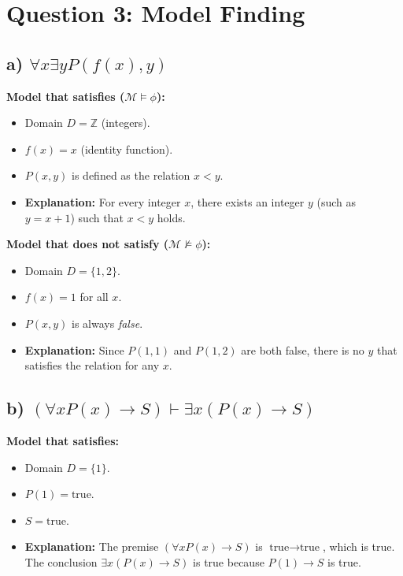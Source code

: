 \documentclass{article}
\begin{document}
\newpage
\section*{Question 3: Model Finding}
\subsection*{a) $\forall x \exists y P(f(x), y)$}
\textbf{Model that satisfies ($\mathcal{M} \models \phi$):}
\begin{itemize}
    \item Domain $D = \mathbb{Z}$ (integers).
    \item $f(x) = x$ (identity function).
    \item $P(x, y)$ is defined as the relation $x < y$.
    \item \textbf{Explanation:} For every integer $x$, there exists an integer $y$ (such as $y = x+1$) such that $x < y$ holds.
\end{itemize}

\textbf{Model that does not satisfy ($\mathcal{M} \not\models \phi$):}
\begin{itemize}
    \item Domain $D = \{1, 2\}$.
    \item $f(x) = 1$ for all $x$.
    \item $P(x, y)$ is always \textit{false}.
    \item \textbf{Explanation:} Since $P(1, 1)$ and $P(1, 2)$ are both false, there is no $y$ that satisfies the relation for any $x$.
\end{itemize}

\subsection*{b) $(\forall x P(x) \rightarrow S) \vdash \exists x (P(x) \rightarrow S)$}
\textbf{Model that satisfies:}
\begin{itemize}
    \item Domain $D = \{1\}$.
    \item $P(1) = \text{true}$.
    \item $S = \text{true}$.
    \item \textbf{Explanation:} The premise $(\forall x P(x) \rightarrow S)$ is $\text{true} \rightarrow \text{true}$, which is true. The conclusion $\exists x (P(x) \rightarrow S)$ is true because $P(1) \rightarrow S$ is true.
\end{itemize}
\end{document}
